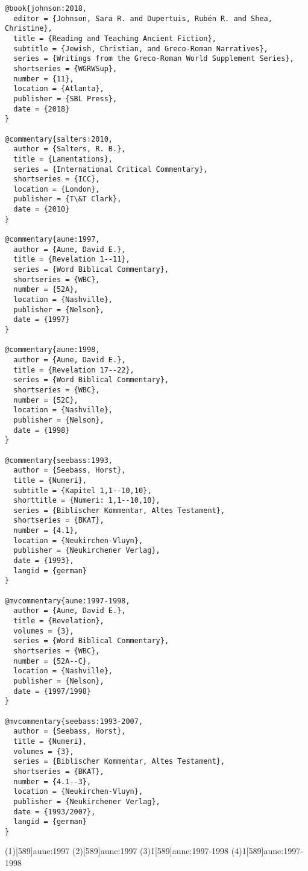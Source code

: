\documentclass[a4paper]{article}
\begin{document}
\begin{verbatim}
@book{johnson:2018,
  editor = {Johnson, Sara R. and Dupertuis, Rubén R. and Shea, Christine},
  title = {Reading and Teaching Ancient Fiction},
  subtitle = {Jewish, Christian, and Greco-Roman Narratives},
  series = {Writings from the Greco-Roman World Supplement Series},
  shortseries = {WGRWSup},
  number = {11},
  location = {Atlanta},
  publisher = {SBL Press},
  date = {2018}
}

@commentary{salters:2010,
  author = {Salters, R. B.},
  title = {Lamentations},
  series = {International Critical Commentary},
  shortseries = {ICC},
  location = {London},
  publisher = {T\&T Clark},
  date = {2010}
}

@commentary{aune:1997,
  author = {Aune, David E.},
  title = {Revelation 1--11},
  series = {Word Biblical Commentary},
  shortseries = {WBC},
  number = {52A},
  location = {Nashville},
  publisher = {Nelson},
  date = {1997}
}

@commentary{aune:1998,
  author = {Aune, David E.},
  title = {Revelation 17--22},
  series = {Word Biblical Commentary},
  shortseries = {WBC},
  number = {52C},
  location = {Nashville},
  publisher = {Nelson},
  date = {1998}
}

@commentary{seebass:1993,
  author = {Seebass, Horst},
  title = {Numeri},
  subtitle = {Kapitel 1,1--10,10},
  shorttitle = {Numeri: 1,1--10,10},
  series = {Biblischer Kommentar, Altes Testament},
  shortseries = {BKAT},
  number = {4.1},
  location = {Neukirchen-Vluyn},
  publisher = {Neukirchener Verlag},
  date = {1993},
  langid = {german}
}

@mvcommentary{aune:1997-1998,
  author = {Aune, David E.},
  title = {Revelation},
  volumes = {3},
  series = {Word Biblical Commentary},
  shortseries = {WBC},
  number = {52A--C},
  location = {Nashville},
  publisher = {Nelson},
  date = {1997/1998}
}

@mvcommentary{seebass:1993-2007,
  author = {Seebass, Horst},
  title = {Numeri},
  volumes = {3},
  series = {Biblischer Kommentar, Altes Testament},
  shortseries = {BKAT},
  number = {4.1--3},
  location = {Neukirchen-Vluyn},
  publisher = {Neukirchener Verlag},
  date = {1993/2007},
  langid = {german}
}
\end{verbatim}

\begin{verbcite}
  \nocite{johnson:2018, salters:2010, aune:1998, seebass:1993,
    seebass:1993-2007}
\end{verbcite}
\examplecite(1)[589]{aune:1997}
\examplecite(2)[589]{aune:1997}
\examplevolcite(3){1}[589]{aune:1997-1998}
\examplevolcite(4){1}[589]{aune:1997-1998}
\exampleabbreviations
\examplebibliography
{}
\end{document}
